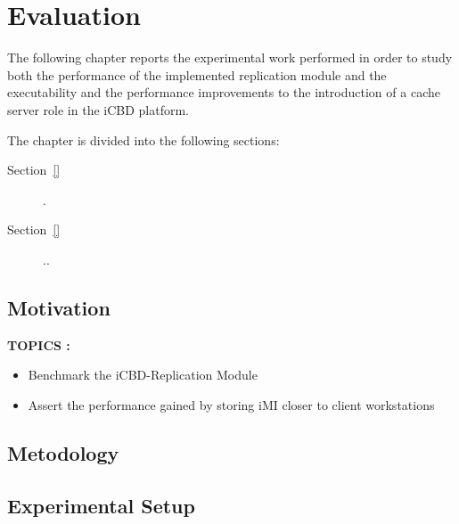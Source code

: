 \chapter{Evaluation}
\label{cha:evaluation}

The following chapter reports the experimental work performed in order to study both the performance of the implemented replication module and the executability and the performance improvements to the introduction of a cache server role in the iCBD platform.

The chapter is divided into the following sections:

\begin{description}
    \item [Section~\ref{}] .
    \item [Section~\ref{}] ..
\end{description}


\section{Motivation}
\label{sec:eval_motivation}

\textbf{TOPICS :}
\begin{itemize}
	\item Benchmark the iCBD-Replication Module
	\item Assert the performance gained by storing iMI closer to client workstations
\end{itemize}



\section{Metodology}
\label{sec:eval_method}

\section{Experimental Setup}
\label{sec:eval_exp_setup}

